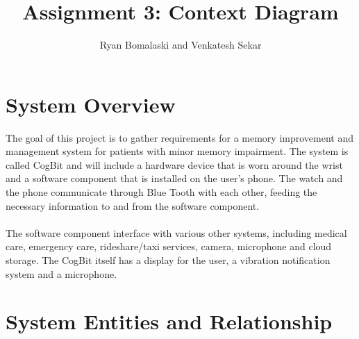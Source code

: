 \documentclass[12pt]{article}
\begin{document}
\title{Assignment 3: Context Diagram}
\author{Ryan Bomalaski and Venkatesh Sekar}

\maketitle

\section*{System Overview}
The goal of this project is to gather requirements for a memory improvement and management system for patients with minor memory impairment.  The system is called CogBit and will include a hardware device that is worn around the wrist and a software component that is installed on the user's phone. The watch and the phone communicate through Blue Tooth with each other, feeding the necessary information to and from the software component.\\
\\
The software component interface with various other systems, including medical care, emergency care, rideshare/taxi services, camera, microphone and cloud storage.  The CogBit itself has a display for the user, a vibration notification system and a microphone.


\section*{System Entities and Relationship}
\end{document}
